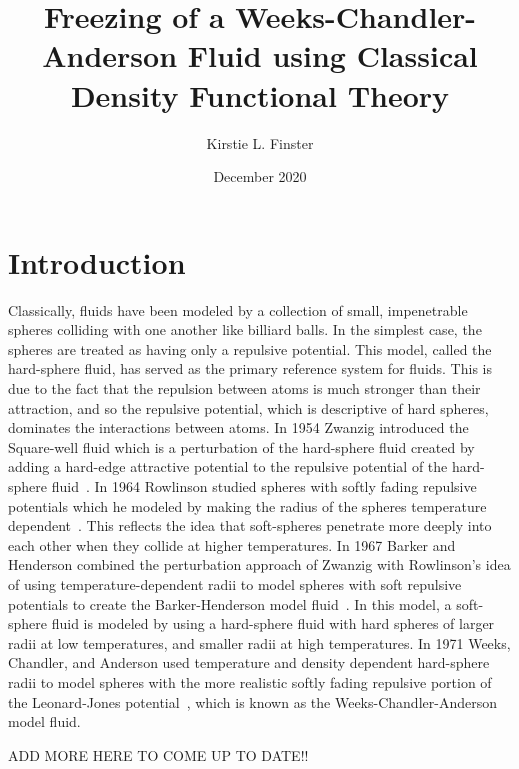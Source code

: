 \documentclass[double,12pt]{beavtex}
\title{Freezing of a Weeks-Chandler-Anderson Fluid using Classical Density Functional Theory}
\author{Kirstie L. Finster}
\date{December 2020}
\begin{document}
   \maketitle
   \mainmatter

\chapter{Introduction}

Classically, fluids have been modeled by a collection of small, 
impenetrable spheres colliding with one another like billiard balls. 
In the simplest case, the spheres are treated as having only a repulsive 
potential. This model, called the hard-sphere fluid, has served as the 
primary reference system for fluids. This is due to the fact that the 
repulsion between atoms is much stronger than their attraction, and so 
the repulsive potential, which is descriptive of hard spheres, dominates 
the interactions between atoms. In 1954 Zwanzig introduced the Square-well 
fluid which is a perturbation of the hard-sphere fluid created by adding 
a hard-edge attractive potential to the repulsive potential of the 
hard-sphere fluid~\cite{ZwanzigSqrWell}. In 1964 Rowlinson studied 
spheres with softly fading repulsive potentials which he modeled by making
the radius of the spheres temperature dependent~\cite{rowlinson1964statistical}. 
This reflects the idea that soft-spheres penetrate more deeply into 
each other when they collide at higher temperatures. 
In 1967 Barker and Henderson combined the perturbation approach of Zwanzig 
with Rowlinson's idea of using temperature-dependent radii to model spheres 
with soft repulsive potentials to create the Barker-Henderson model 
fluid~\cite{barker1967perturbation}. In this model, a soft-sphere fluid is 
modeled by using a hard-sphere fluid with hard spheres of larger radii 
at low temperatures, and smaller radii at high temperatures. In 1971 Weeks, 
Chandler, and Anderson used temperature and density dependent hard-sphere 
radii to model spheres with the more realistic softly fading repulsive 
portion of the Leonard-Jones potential~\cite{andersen1971relationship}, 
which is known as the Weeks-Chandler-Anderson model fluid. 

ADD MORE HERE TO COME UP TO DATE!!
\newline
\end{document}
